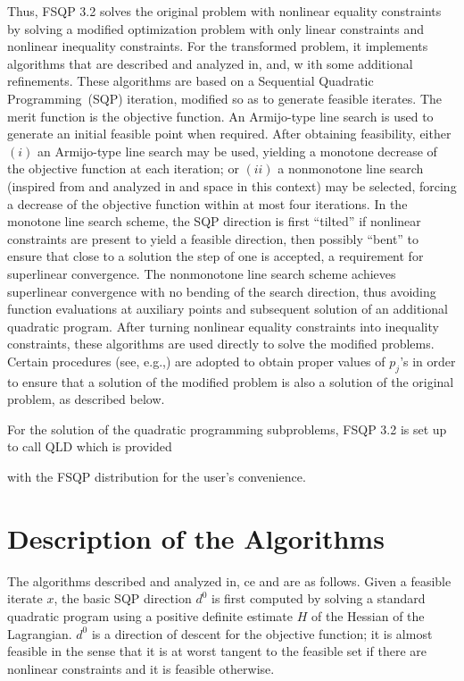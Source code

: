 Thus, FSQP 3.2 solves the original problem with nonlinear equality constraints
by solving a modified optimization problem with only linear constraints 
and nonlinear inequality constraints.  For the transformed problem,
it implements algorithms that are described 
and analyzed in\Lspace {}\Rcitemark \Rspace{},
\Rcitemark \Rspace{} and\Lspace {}\Rcitemark \Rspace{}, w
ith some additional refinements.
These algorithms are based on a Sequential Quadratic Programming~(SQP)
iteration, modified so as to generate feasible iterates. 
The merit function is the objective function. 
An Armijo-type line search is used to generate an initial feasible point 
when required.
After obtaining feasibility, either $(i)$ an Armijo-type line
search may be used, yielding a monotone decrease of the 
objective function at each iteration\Lspace {}\Rcitemark \Rspace{}; 
or $(ii)$ a nonmonotone line 
search (inspired from\Lspace {}\Rcitemark \Rspace{} and analyzed
in\Lspace {}\Rcitemark \Rspace{} and\Lspace {}\Rcitemark \R
space{} in this context)
may be selected, forcing a decrease of 
the objective function within at most four iterations.
In the monotone line search scheme, the SQP direction is first 
``tilted'' if nonlinear constraints are present
to yield a feasible direction, then possibly ``bent'' to ensure 
that close to a solution the step of one is accepted, 
a requirement for superlinear convergence.
The nonmonotone line search scheme achieves superlinear convergence 
with no bending of the search direction, thus avoiding function 
evaluations at auxiliary points and subsequent solution of 
an additional quadratic program. After turning nonlinear equality
constraints into inequality constraints, these algorithms are
used directly to solve the modified problems. Certain procedures
(see, e.g.,\Lspace {}\Rcitemark \Rspace{})
are adopted to obtain proper values of $p_j$'s in order to
ensure that a solution of the modified problem is also a solution
of the original problem, as described below.

For the solution of the quadratic programming subproblems, FSQP 3.2
is set up to call QLD\Lspace {}\Rcitemark \Rspace{} which is provided
 
with the FSQP distribution for the user's convenience.

\section{Description of the Algorithms}
\label{algo}
The algorithms described and analyzed 
in\Lspace {}\Rcitemark \Rspace{},\Lspace {}\Rcitemark \Rspa
ce{} 
and\Lspace {}\Rcitemark \Rspace{} are as follows.
Given a feasible iterate $x$, the basic SQP direction
$d^0$ is first computed by solving a standard quadratic program 
using a positive definite estimate $H$ of 
the Hessian of the Lagrangian. 
$d^0$ is a direction of descent for the objective function; it is 
almost feasible in the sense that it is at worst tangent to 
the feasible set if there are nonlinear constraints and it is feasible 
otherwise.

